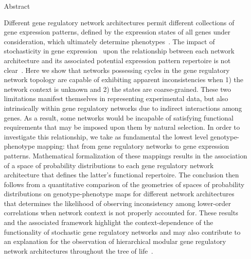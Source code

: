 


{\noindent\large Abstract}

Different gene regulatory network architectures permit different collections of gene expression patterns, defined by the expression states of all genes under consideration, which ultimately determine phenotypes~\cite{Alon2007,Milo2004}. The impact of stochasticity in gene expression~\cite{Eldar2010,Sanchez2013} upon the relationship between each network architecture and its associated potential expression pattern repertoire is not clear~\cite{Jothi2009,Golding2005,Lestas2010,Hilfinger2012,Chalancon2012}. Here we show that networks possessing cycles in the gene regulatory network topology are capable of exhibiting apparent inconsistencies when 1) the network context is unknown and 2) the states are coarse-grained. These two limitations manifest themselves in representing experimental data, but also intrinsically within gene regulatory networks due to indirect interactions among genes. As a result, some networks would be incapable of satisfying functional requirements that may be imposed upon them by natural selection. In order to investigate this relationship, we take as fundamental the lowest level genotype-phenotype mapping: that from gene regulatory networks to gene expression patterns. Mathematical formalization of these mappings results in the association of a space of probability distributions to each gene regulatory network architecture that defines the latter's functional repertoire. The conclusion then follows from a quantitative comparison of the geometries of spaces of probability distributions on genotype-phenotype maps for different network architectures that determines the likelihood of observing inconsistency among lower-order correlations when network context is not properly accounted for. These results and the associated framework highlight the context-dependence of the functionality of stochastic gene regulatory networks and may also contribute to an explanation for the observation of hierarchical modular gene regulatory network architectures throughout the tree of life~\cite{Ravasz2002,Segre2005,Wagner2007,Erwin2009,Jothi2009,Bhardwaj2010,Colm}.



